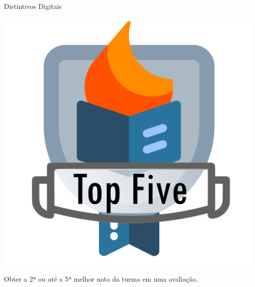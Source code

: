 \documentclass[xcolor=dvipsnames,table]{beamer}
\begin{document}
	\begin{frame}{Distintivos Digitais}
		\begin{block}{}
			\begin{center}
	    		\includegraphics[height=.65\textheight]{images/badges/top-five.png}
	  		\end{center}		
	  		Obter a 2ª ou até a 5ª melhor nota da turma em uma avaliação. 
		\end{block}
	\end{frame}
	
\end{document}
